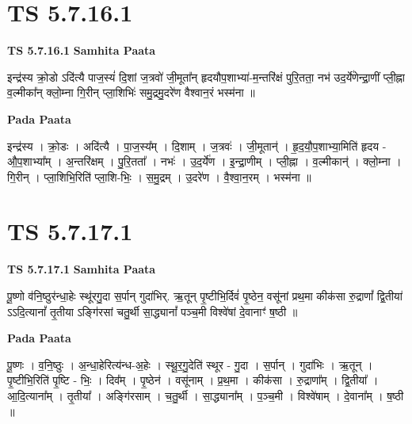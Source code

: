 \documentclass[17pt]{extarticle}
\begin{document}

\section{ TS 5.7.16.1 }

\textbf{TS 5.7.16.1 } \newline
\textbf{Samhita Paata} \newline

इन्द्र॑स्य क्रो॒डो ऽदि॑त्यै पाज॒स्यं॑ दि॒शां ज॒त्रवो॑ जी॒मूता᳚न् हृदयौप॒शाभ्या॑-म॒न्तरि॑क्षं पुरि॒तता॒ नभ॑ उद॒र्ये॑णेन्द्रा॒णीं प्ली॒ह्ना व॒ल्मीका᳚न् क्लो॒म्ना गि॒रीन् प्ला॒शिभिः॑ समु॒द्रमु॒दरे॑ण वैश्वान॒रं भस्म॑ना ॥ \newline

\textbf{Pada Paata} \newline

इन्द्र॑स्य । क्रो॒डः । अदि॑त्यै । पा॒ज॒स्य᳚म् । दि॒शाम् । ज॒त्रवः॑ । जी॒मूतान्॑ । हृ॒द॒यौ॒प॒शाभ्या॒मिति॑ हृदय - औ॒प॒शाभ्या᳚म् । अ॒न्तरि॑क्षम् । पु॒रि॒तता᳚ । नभः॑ । उ॒द॒र्ये॑ण । इ॒न्द्रा॒णीम् । प्ली॒ह्ना । व॒ल्मीकान्॑ । क्लो॒म्ना । गि॒रीन् । प्ला॒शिभि॒रिति॑ प्ला॒शि-भिः॒ । स॒मु॒द्रम् । उ॒दरे॑ण । वै॒श्वा॒न॒रम् । भस्म॑ना ॥  \newline





\section{ TS 5.7.17.1 }

\textbf{TS 5.7.17.1 } \newline
\textbf{Samhita Paata} \newline

पू॒ष्णो व॑नि॒ष्ठुर॑न्धा॒हेः स्थू॑रगु॒दा स॒र्पान् गुदा॑भिर्. ऋ॒तून् पृ॒ष्टीभि॒र्दिवं॑ पृ॒ष्ठेन॒ वसू॑नां प्रथ॒मा कीक॑सा रु॒द्राणां᳚ द्वि॒तीया॑ ऽऽदि॒त्यानां᳚ तृ॒तीया ऽङ्गि॑रसां चतु॒र्थी सा॒द्ध्यानां᳚ पञ्च॒मी विश्वे॑षां दे॒वानाꣳ॑ ष॒ष्ठी ॥ \newline

\textbf{Pada Paata} \newline

पू॒ष्णः । व॒नि॒ष्ठुः । अ॒न्धा॒हेरित्य॑न्ध-अ॒हेः । स्थू॒र॒गु॒देति॑ स्थूर - गु॒दा । स॒र्पान् । गुदा॑भिः । ऋ॒तून् । पृ॒ष्टीभि॒रिति॑ पृ॒ष्टि - भिः॒ । दिव᳚म् । पृ॒ष्ठेन॑ । वसू॑नाम् । प्र॒थ॒मा । कीक॑सा । रु॒द्राणा᳚म् । द्वि॒तीया᳚ । आ॒दि॒त्याना᳚म् । तृ॒तीया᳚ । अङ्गि॑रसाम् । च॒तु॒र्थी । सा॒द्ध्याना᳚म् । प॒ञ्च॒मी । विश्वे॑षाम् । दे॒वाना᳚म् । ष॒ष्ठी ॥  \newline
\end{document}
